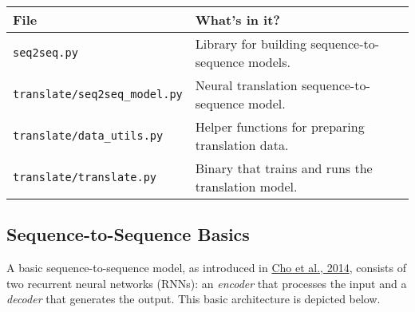 \begin{longtable}[c]{@{}ll@{}}
\toprule
\begin{minipage}[b]{0.05\columnwidth}\raggedright\strut
File
\strut\end{minipage} &
\begin{minipage}[b]{0.05\columnwidth}\raggedright\strut
What's in it?
\strut\end{minipage}\tabularnewline
\midrule
\endhead
\begin{minipage}[t]{0.05\columnwidth}\raggedright\strut
\texttt{seq2seq.py}
\strut\end{minipage} &
\begin{minipage}[t]{0.05\columnwidth}\raggedright\strut
Library for building sequence-to-sequence models.
\strut\end{minipage}\tabularnewline
\begin{minipage}[t]{0.05\columnwidth}\raggedright\strut
\texttt{translate/seq2seq\_model.py}
\strut\end{minipage} &
\begin{minipage}[t]{0.05\columnwidth}\raggedright\strut
Neural translation sequence-to-sequence model.
\strut\end{minipage}\tabularnewline
\begin{minipage}[t]{0.05\columnwidth}\raggedright\strut
\texttt{translate/data\_utils.py}
\strut\end{minipage} &
\begin{minipage}[t]{0.05\columnwidth}\raggedright\strut
Helper functions for preparing translation data.
\strut\end{minipage}\tabularnewline
\begin{minipage}[t]{0.05\columnwidth}\raggedright\strut
\texttt{translate/translate.py}
\strut\end{minipage} &
\begin{minipage}[t]{0.05\columnwidth}\raggedright\strut
Binary that trains and runs the translation model.
\strut\end{minipage}\tabularnewline
\bottomrule
\end{longtable}

\subsection{Sequence-to-Sequence Basics
}\label{sequence-to-sequence-basics}

A basic sequence-to-sequence model, as introduced in
\href{http://arxiv.org/pdf/1406.1078v3.pdf}{Cho et al., 2014}, consists
of two recurrent neural networks (RNNs): an \emph{encoder} that
processes the input and a \emph{decoder} that generates the output. This
basic architecture is depicted below.

